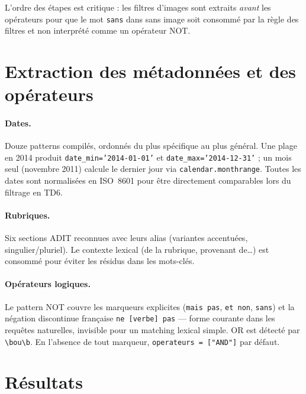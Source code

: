 L'ordre des étapes est critique : les filtres d'images sont extraits \emph{avant} les
opérateurs pour que le mot \texttt{sans} dans \og{}sans image\fg{} soit consommé par la
règle des filtres et non interprété comme un opérateur NOT.

\section{Extraction des métadonnées et des opérateurs}

\paragraph{Dates.} Douze patterns compilés, ordonnés du plus spécifique au plus général.
Une plage \og{}en 2014\fg{} produit \texttt{date\_min='2014-01-01'} et
\texttt{date\_max='2014-12-31'} ; un mois seul (\og{}novembre 2011\fg{}) calcule le
dernier jour via \texttt{calendar.monthrange}. Toutes les dates sont normalisées en
ISO~8601 pour être directement comparables lors du filtrage en TD6.

\paragraph{Rubriques.} Six sections ADIT reconnues avec leurs alias (variantes accentuées,
singulier/pluriel). Le contexte lexical (\og{}de la rubrique\fg{}, \og{}provenant de\fg{}…)
est consommé pour éviter les résidus dans les mots-clés.

\paragraph{Opérateurs logiques.} Le pattern NOT couvre les marqueurs explicites
(\texttt{mais pas}, \texttt{et non}, \texttt{sans}) et la négation discontinue française
\texttt{ne [verbe] pas} — forme courante dans les requêtes naturelles, invisible pour
un matching lexical simple. OR est détecté par \verb|\bou\b|. En l'absence de tout
marqueur, \texttt{operateurs = ["AND"]} par défaut.

\section{Résultats}


